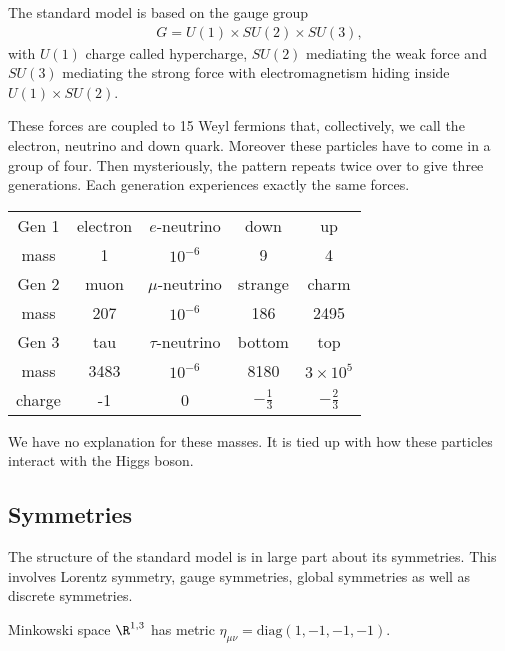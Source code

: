 
The standard model is based on the gauge group
\begin{align}
    G = U\left( 1 \right) \times  SU \left( 2 \right) \times  SU \left( 3 \right) 
,\end{align}
with $U\left( 1 \right) $ charge called hypercharge, $SU\left( 2 \right) $ mediating the weak force and $SU\left( 3 \right) $ mediating the strong force with electromagnetism hiding inside $U\left( 1 \right) \times  SU \left( 2 \right) $.

These forces are coupled to 15 Weyl fermions that, collectively, we call the electron, neutrino and down quark. Moreover these particles have to come in a group of four. Then mysteriously, the pattern repeats twice over to give three generations. Each generation experiences exactly the same forces.


\begin{table}[h]
    \centering
    \label{tab:parts}
    \begin{tabular}{c|cccc}
    Gen 1 & electron & $e$-neutrino & down & up \\
    mass &1 & $10^{-6}$ & 9 & 4 \\
    \midrule
        Gen 2 & muon & $\mu$-neutrino & strange & charm \\
        mass & 207 & $10^{-6}$ & 186 & 2495 \\
    \midrule
    Gen 3& tau & $\tau$-neutrino & bottom & top \\
       mass & 3483 & $10^{-6}$ & 8180 & $3 \times 10^{5}$ \\
       \midrule 
       charge & -1 & 0 & $-\frac{1}{3}$ & $-\frac{2}{3}$ \\
    \end{tabular}
\end{table}

We have no explanation for these masses. It is tied up with how these particles interact with the Higgs boson.

\subsection{Symmetries}

The structure of the standard model is in large part about its symmetries. This involves Lorentz symmetry, gauge symmetries, global symmetries as well as discrete symmetries.

Minkowski space $\R^{1,3}$ has metric $\eta_{\mu \nu} = \text{diag}\left( 1, -1, -1, -1 \right) $. 

